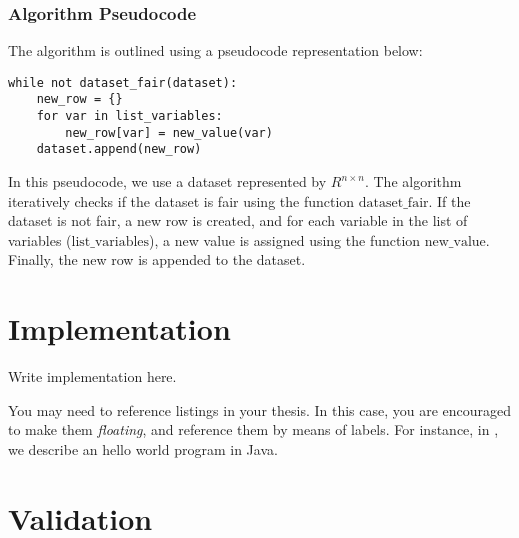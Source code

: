 \documentclass[12pt,a4paper,openright,twoside]{book}
\begin{document}
\subsection{Algorithm Pseudocode}

The algorithm is outlined using a pseudocode representation below:

\begin{verbatim}
while not dataset_fair(dataset):
    new_row = {}
    for var in list_variables:
        new_row[var] = new_value(var)
    dataset.append(new_row)
\end{verbatim}

In this pseudocode, we use a dataset represented by \( R^{n \times n} \). The algorithm iteratively checks if the dataset is fair using the function \( \text{dataset\_fair} \). If the dataset is not fair, a new row is created, and for each variable in the list of variables (\( \text{list\_variables} \)), a new value is assigned using the function \( \text{new\_value} \). Finally, the new row is appended to the dataset.


%
%

\chapter{Implementation} %
\label{chap:implementation}

Write implementation here.



You may need to reference listings in your thesis.
%
In this case, you are encouraged to make them \emph{floating}, and reference them by means of labels.
%
For instance, in , we describe an hello world program in Java.

\chapter{Validation} %
\label{chap:validation}
\end{document}
